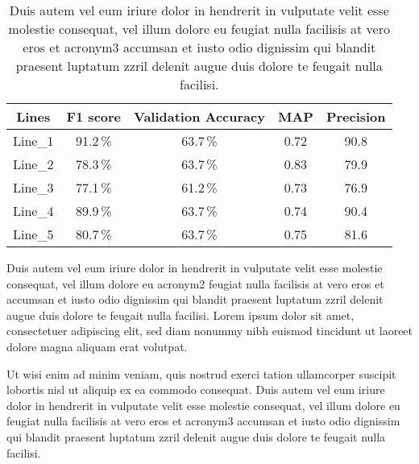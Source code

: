 \begin{table}[H]\scriptsize
\centering
\begin{tabular}{c|cccc}
     Lines& F1 score&Validation Accuracy&MAP &Precision\\
    \hline
    Line\_1	& 91.2\,\%	& 63.7\,\%	& 0.72  &90.8\\
    Line\_2	& 78.3\,\%	& 63.7\,\%	& 0.83 &79.9\\
    Line\_3	& 77.1\,\%	& 61.2\,\%	& 0.73  &76.9\\
    Line\_4 & 89.9\,\%	& 63.7\,\%	& 0.74  &90.4\\
    Line\_5 & 80.7\,\% & 63.7\,\%  & 0.75 &81.6\\ 
\end{tabular}
\caption{Duis autem vel eum iriure dolor in hendrerit in vulputate velit esse molestie consequat, vel illum dolore eu feugiat nulla facilisis at vero eros et \acrfull{acronym3} accumsan et iusto odio dignissim qui blandit praesent luptatum zzril delenit augue duis dolore te feugait nulla facilisi.}
\label{tab:eval}
\end{table}

Duis autem vel eum iriure dolor in hendrerit in vulputate velit esse molestie consequat, vel illum dolore eu \acrfull{acronym2} feugiat nulla facilisis at vero eros et accumsan et iusto odio dignissim qui blandit praesent luptatum zzril delenit augue duis dolore te feugait nulla facilisi. Lorem ipsum dolor sit amet, consectetuer adipiscing elit, sed diam nonummy nibh euismod tincidunt ut laoreet dolore magna aliquam erat volutpat. 

Ut wisi enim ad minim veniam, quis nostrud exerci tation ullamcorper suscipit lobortis nisl ut aliquip ex ea commodo consequat. Duis autem vel eum iriure dolor in hendrerit in vulputate velit esse molestie consequat, vel illum dolore eu feugiat nulla facilisis at vero eros et \acrfull{acronym3} accumsan et iusto odio dignissim qui blandit praesent luptatum zzril delenit augue duis dolore te feugait nulla facilisi.


